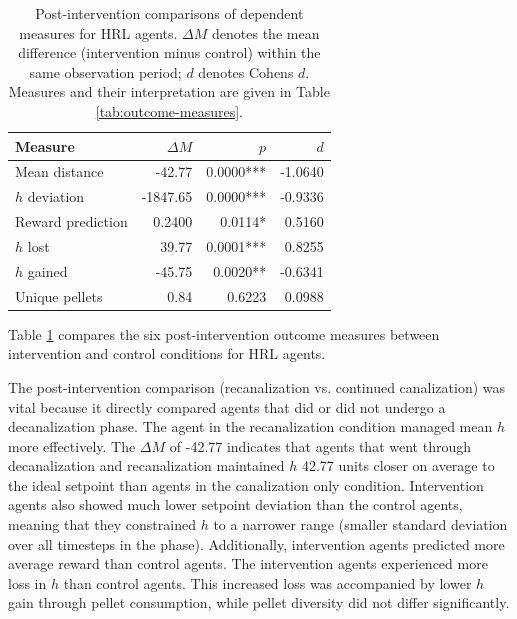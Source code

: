 \documentclass[12pt,fleqn]{article}
\begin{document}
\begin{table}[htbp]
  \centering
  \small
  \begin{tabular}{@{}lrrr@{}}
    \toprule
    \textbf{Measure} & \textbf{\(\Delta M\)} & \textbf{\(p\)} & \textbf{\(d\)} \\
    \midrule
    Mean distance & -42.77 & 0.0000*** & -1.0640 \\
    \(h\) deviation & -1847.65 & 0.0000*** & -0.9336 \\
    Reward prediction & 0.2400 & 0.0114* & 0.5160 \\
    \(h\) lost & 39.77 & 0.0001*** & 0.8255 \\
    \(h\) gained & -45.75 & 0.0020** & -0.6341 \\
    Unique pellets & 0.84 & 0.6223 & 0.0988 \\
    \bottomrule
  \end{tabular}
  \caption{Post-intervention comparisons of dependent measures for HRL agents. \(\Delta M\) denotes the mean difference (intervention minus control) within the same observation period; \(d\) denotes Cohen\textquotesingle s \(d\). Measures and their interpretation are given in Table \ref{tab:outcome-measures}.}
  \label{model-analysis-hrl}
\end{table}

Table \ref{model-analysis-hrl} compares the six post-intervention outcome measures between intervention and control conditions for HRL agents.

The post-intervention comparison (recanalization vs. continued canalization) was vital because it directly compared agents that did or did not undergo a decanalization phase. The agent in the recanalization condition managed mean \(h\) more effectively. The $\Delta M$ of -42.77 indicates that agents that went through decanalization and recanalization maintained $h$ 42.77 units closer on average to the ideal setpoint than agents in the canalization only condition. Intervention agents also showed much lower setpoint deviation than the control agents, meaning that they constrained $h$ to a narrower range (smaller standard deviation over all timesteps in the phase). Additionally, intervention agents predicted more average reward than control agents. The intervention agents experienced more loss in \(h\) than control agents. This increased loss was accompanied by lower \(h\) gain through pellet consumption, while pellet diversity did not differ significantly.
\end{document}
